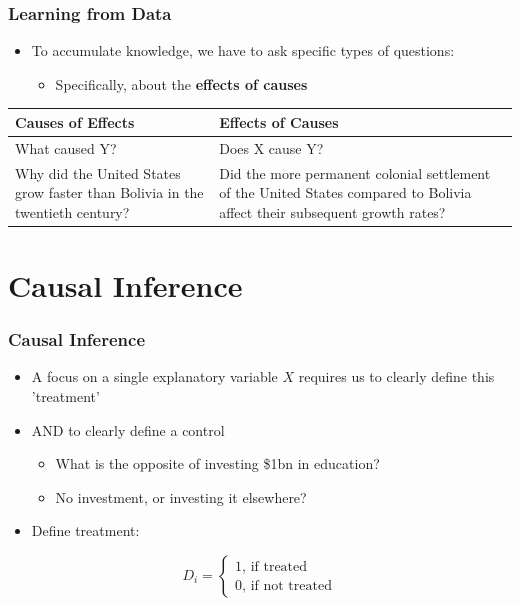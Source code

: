 \documentclass[xcolor=x11names,compress]{beamer}\usepackage[]{graphicx}\usepackage[]{color}
\renewcommand{\(}{\begin{columns}}
\renewcommand{\)}{\end{columns}}
\newcommand{\<}[1]{\begin{column}{#1}}
\renewcommand{\>}{\end{column}}
\begin{document}
\begin{frame}
\frametitle{Learning from Data}
\begin{itemize}
\item To accumulate knowledge, we have to ask specific types of questions:
\begin{itemize}
\item Specifically, about the \textbf{effects of causes}
\end{itemize}
\end{itemize}
\begin{table}[htbp]
  \centering
    \begin{tabular}{|>{\raggedright}p{5cm}|p{5cm}|}
    \toprule
    \textbf{Causes of Effects} & \textbf{Effects of Causes} \\
    \midrule
    What caused Y? & Does X cause Y? \\
    \midrule
    Why did the United States grow faster than Bolivia in the twentieth century? & Did the more permanent colonial settlement of the United States compared to Bolivia affect their subsequent growth rates? \\
    \bottomrule
    \end{tabular}%
  \label{tab:addlabel}%
\end{table}%
\end{frame}

\section{Causal Inference}

\begin{frame}
\frametitle{Causal Inference}
\begin{itemize}
\item A focus on a single explanatory variable $X$ requires us to clearly define this 'treatment' 
\item AND to clearly define a control
\begin{itemize}
\item What is the opposite of investing \$1bn in education?
\item No investment, or investing it elsewhere?
\end{itemize}
\item Define treatment:
\end{itemize}
\[D_i = 
\begin{cases}
1 \text{, if treated} \\
0 \text{, if not treated}
\end{cases}
\]
\end{frame}
\end{document}
